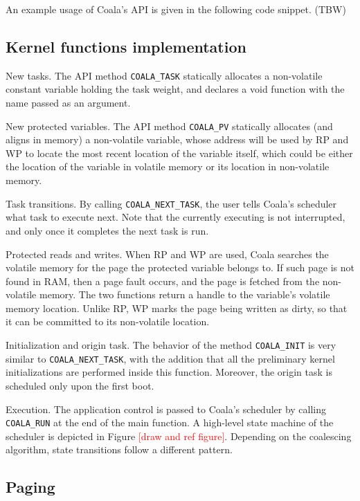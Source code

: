 An example usage of Coala’s API is given in the following code snippet. (TBW)

\subsection{Kernel functions implementation}

New tasks. The API method \texttt{COALA\_TASK} statically allocates a non-volatile constant variable holding the task weight, and declares a void function with the name passed as an argument.

New protected variables. The API method \texttt{COALA\_PV} statically allocates (and aligns in memory) a non-volatile variable, whose address will be used by RP and WP to locate the most recent location of the variable itself, which could be either the location of the variable in volatile memory or its location in non-volatile memory.

Task transitions. By calling \texttt{COALA\_NEXT\_TASK}, the user tells Coala’s scheduler what task to execute next. Note that the currently executing is not interrupted, and only once it completes the next task is run.

Protected reads and writes. When RP and WP are used, Coala searches the volatile memory for the page the protected variable belongs to. If such page is not found in RAM, then a page fault occurs, and the page is fetched from the non-volatile memory. The two functions return a handle to the variable’s volatile memory location. Unlike RP, WP marks the page being written as dirty, so that it can be committed to its non-volatile location.

Initialization and origin task. The behavior of the method \texttt{COALA\_INIT} is very similar to \texttt{COALA\_NEXT\_TASK}, with the addition that all the preliminary kernel initializations are performed inside this function. Moreover, the origin task is scheduled only upon the first boot.

Execution. The application control is passed to Coala’s scheduler by calling \texttt{COALA\_RUN} at the end of the main function. A high-level state machine of the scheduler is depicted in Figure \textcolor{red}{[draw and ref figure]}. Depending on the coalescing algorithm, state transitions follow a different pattern.

\subsection{Paging}

